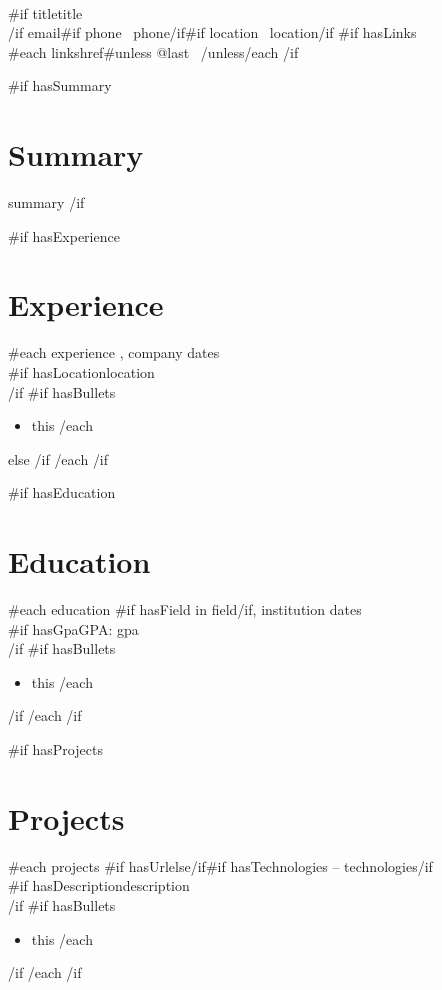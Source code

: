 \documentclass[10.5pt,a4paper]{article}
\begin{document}
\begin{center}
  {\Large {}\relax{}}\\[1pt]
  {{#if title}}{{title}}\\[2pt]
  {{/if}}
  {{email}}{{#if phone}} \textbullet\ {{phone}}{{/if}}{{#if location}} \textbullet\ {{location}}{{/if}}
  {{#if hasLinks}}\\
  {{#each links}}{{href}}{{#unless @last}} \textbullet\ {{/unless}}{{/each}}
  {{/if}}
\end{center}

{{#if hasSummary}}
\section*{Summary}
{{summary}}
{{/if}}

{{#if hasExperience}}
\section*{Experience}
{{#each experience}}
\textbf{\relax{}}, {{company}} \hfill {{dates}}\\
{{#if hasLocation}}{{location}}\\
{{/if}}
{{#if hasBullets}}
\begin{itemize}
{{#each bullets}}\item {{this}}
{{/each}}
\end{itemize}
{{else}}
\vspace{4pt}
{{/if}}
{{/each}}
{{/if}}

{{#if hasEducation}}
\section*{Education}
{{#each education}}
\textbf{\relax{}}{{#if hasField}} in {{field}}{{/if}}, {{institution}} \hfill {{dates}}\\
{{#if hasGpa}}GPA: {{gpa}}\\
{{/if}}
{{#if hasBullets}}
\begin{itemize}
{{#each bullets}}\item {{this}}
{{/each}}
\end{itemize}
{{/if}}
{{/each}}
{{/if}}

{{#if hasProjects}}
\section*{Projects}
{{#each projects}}
{{#if hasUrl}}\textbf{\relax{}}{{else}}\textbf{\relax{}}{{/if}}{{#if hasTechnologies}} -- {{technologies}}{{/if}}\\
{{#if hasDescription}}{{description}}\\
{{/if}}
{{#if hasBullets}}
\begin{itemize}
{{#each bullets}}\item {{this}}
{{/each}}
\end{itemize}
{{/if}}
{{/each}}
{{/if}}
\end{document}
